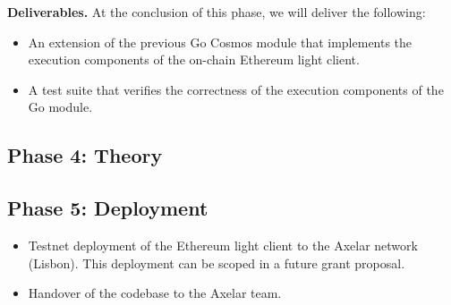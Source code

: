 \noindent
\textbf{Deliverables.} At the conclusion of this phase, we will deliver the following:

\begin{itemize}
  \item An extension of the previous Go Cosmos module that implements the execution components of the on-chain Ethereum light client.
  \item A test suite that verifies the correctness of the execution components of the Go module.
\end{itemize}

\subsection{Phase 4: Theory}

\subsection{Phase 5: Deployment}

\begin{itemize}
  \item Testnet deployment of the Ethereum light client to the Axelar network (Lisbon). This deployment can be scoped in a future grant proposal.
  \item Handover of the codebase to the Axelar team.
\end{itemize}
